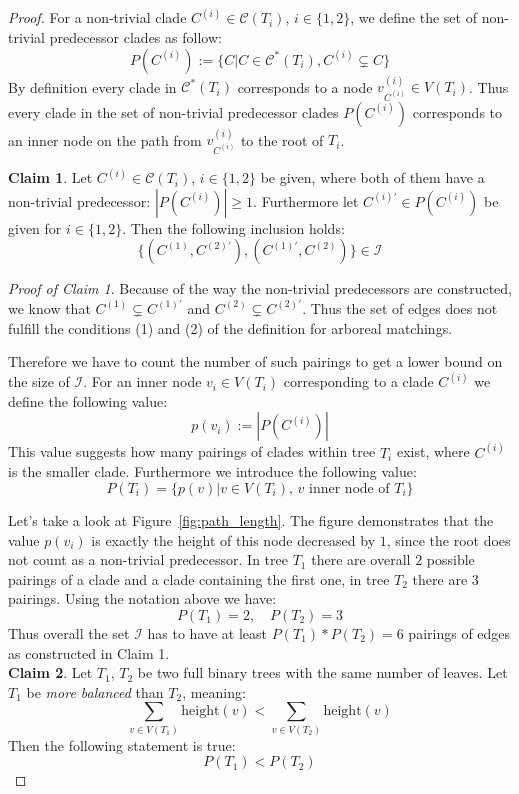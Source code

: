\begin{proof}
For a non-trivial clade $C^{(i)} \in \mathcal{C}(T_i)$, $i \in \{1,2\}$, we define the set of non-trivial predecessor clades as follow:
$$P(C^{(i)}) := \{C | C \in \mathcal{C}^*(T_i), C^{(i)} \subsetneq C\}$$ 
By definition every clade in $\mathcal{C}^*(T_i)$ corresponds to a node $v^{(i)}_{C^{(i)}} \in V(T_i)$. Thus every clade in the set of non-trivial predecessor clades $P(C^{(i)})$ corresponds to an inner node on the path from $v^{(i)}_{C^{(i)}}$ to the root of $T_i$.

\textbf{Claim 1}. Let $C^{(i)} \in \mathcal{C}(T_i)$, $i \in \{1,2\}$ be given, where both of them have a non-trivial predecessor: $|P(C^{(i)})| \geq 1$. Furthermore let $C^{(i)'} \in P(C^{(i)})$ be given for $i \in \{1,2\}$. Then the following inclusion holds:
$$ \{(C^{(1)},C^{(2)'}), (C^{(1)'}, C^{(2)})\} \in \mathcal{I}$$

\textit{Proof of Claim 1}. Because of the way the non-trivial predecessors are constructed, we know that $C^{(1)} \subsetneq C^{(1)'}$ and $C^{(2)} \subsetneq C^{(2)'}$. Thus the set of edges does not fulfill the conditions (1) and (2) of the definition for arboreal matchings.

Therefore we have to count the number of such pairings to get a lower bound on the size of $\mathcal{I}$. For an inner node $v_i \in V(T_i)$ corresponding to a clade $C^{(i)}$ we define the following value:
$$p(v_i) := |P(C^{(i)})|$$ 
This value suggests how many pairings of clades within tree $T_i$ exist, where $C^{(i)}$ is the smaller clade. Furthermore we introduce the following value:
$$P(T_i) = \{ p(v) | v \in V(T_i), \, v \text{ inner node of }T_i\} $$

Let's take a look at Figure~\ref{fig:path_length}. The figure demonstrates that the value $p(v_i)$ is exactly the height of this node decreased by $1$, since the root does not count as a non-trivial predecessor. In tree $T_1$ there are overall $2$ possible pairings of a clade and a clade containing the first one, in tree $T_2$ there are 3 pairings. Using the notation above we have:
$$ P(T_1) = 2,\quad P(T_2) = 3$$
Thus overall the set $\mathcal{I}$ has to have at least $P(T_1)*P(T_2)=6$ pairings of edges as constructed in Claim 1.\\

\textbf{Claim 2}. Let $T_1$, $T_2$ be two full binary trees with the same number of leaves. Let $T_1$ be \textit{more balanced} than $T_2$, meaning:
$$ \sum_{v \in V(T_1)} \text{height}(v) < \sum_{v \in V(T_2)} \text{height}(v)$$
Then the following statement is true:
$$P(T_1) < P(T_2)$$


\end{proof}

